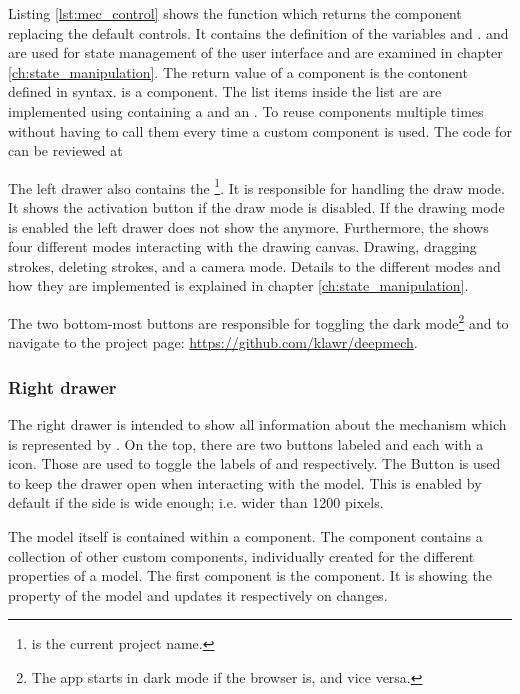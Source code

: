 Listing \ref{lst:mec_control} shows the function which returns the component replacing the default  controls.
It contains the definition of the variables  and .
 and  are used for state management of the user interface and are examined in chapter \ref{ch:state_manipulation}.
The return value of a component is the contonent defined in  syntax.
 is a  component.
The list items inside the list are are implemented using  containing a  and an .
To reuse  components multiple times without having to call them every time a custom  component is used.
The code for  can be reviewed at \aka{} %

The left drawer also contains the \footnote{ is the current project name.}.
It is responsible for handling the draw mode.
It shows the activation button if the draw mode is disabled.
If the drawing mode is enabled the left drawer does not show the  anymore.
Furthermore, the  shows four different modes interacting with the drawing canvas.
Drawing, dragging strokes, deleting strokes, and a camera mode.
Details to the different modes and how they are implemented is explained in chapter \ref{ch:state_manipulation}.

The two bottom-most buttons are responsible for toggling the dark mode\footnote{The app starts in dark mode if the browser is, and vice versa.} and to navigate to the project page: \url{https://github.com/klawr/deepmech}.

\subsubsection{Right drawer}

The right drawer is intended to show all information about the mechanism which is represented by .
On the top, there are two buttons labeled  and  each with a  icon.
Those are used to toggle the labels of  and  respectively.
The  Button is used to keep the drawer open when interacting with the model.
This is enabled by default if the side is wide enough; i.e. wider than 1200 pixels.

The model itself is contained within a  component.
The  component contains a collection of other custom components, individually created for the different properties of a  model.
The  first component is the  component. It is showing the  property of the  model and updates it respectively on changes.

